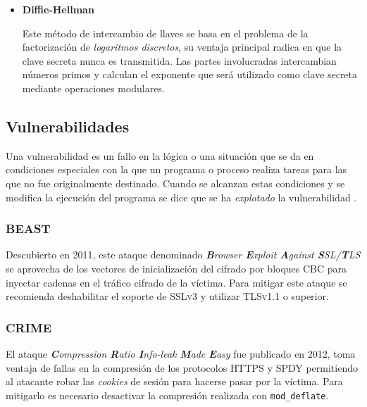       \begin{itemize}

        \item \textbf {Diffie-Hellman}

Este m\'{e}todo de intercambio de llaves se basa en el problema de la factorizaci\'{o}n de \emph{logaritmos discretos}, su ventaja principal radica en que la clave secreta nunca es transmitida. Las partes involucradas intercambian n\'{u}meros primos y calculan el exponente que ser\'{a} utilizado como clave secreta mediante operaciones modulares\cite{_samplesections.pdf_????}.

      \end{itemize}

  \subsection {Vulnerabilidades}

Una vulnerabilidad es un fallo en la l\'{o}gica o una situaci\'{o}n que se da en condiciones especiales con la que un programa o proceso realiza tareas para las que no fue originalmente destinado. Cuando se alcanzan estas condiciones y se modifica la ejecuci\'{o}n del programa se dice que se ha \textit{explotado} la vulnerabilidad \cite{padilla_buenas_2009}.

        \subsubsection{BEAST}

Descubierto en 2011, este ataque denominado \emph{\textbf{B}rowser \textbf{E}xploit \textbf{A}gainst \textbf{S}SL/\textbf{T}LS} se aprovecha de los vectores de inicializaci\'{o}n del cifrado por bloques \textsc{CBC} para inyectar cadenas en el tr\'{a}fico cifrado de la v\'{i}ctima\cite{_beast.pdf_????}. Para mitigar este ataque se recomienda deshabilitar el soporte de \textsc{SSLv3} y utilizar \textsc{TLSv1.1} o superior\cite{_ssl_????-2}.

        \subsubsection{CRIME}

El ataque \emph{\textbf{C}ompression \textbf{R}atio \textbf{I}nfo-leak \textbf{M}ade \textbf{E}asy} fue publicado en 2012, toma ventaja de fallas en la compresi\'{o}n de los protocolos \textsc{HTTPS} y \textsc{SPDY} permitiendo al atacante robar las \emph{cookies} de sesi\'{o}n para hacerse pasar por la v\'{i}ctima. Para mitigarlo es necesario desactivar la compresi\'{o}n realizada con \texttt{mod\_deflate}\cite{goodin_crack_2012}.

